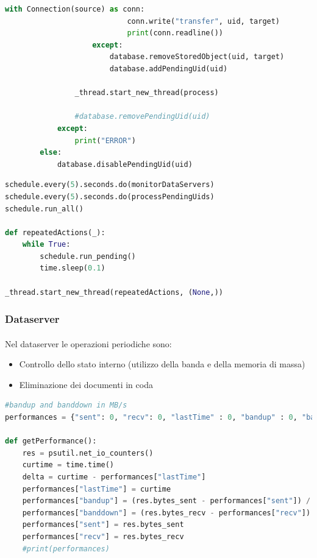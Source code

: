 \documentclass{article}
\begin{document}
\begin{lstlisting}[language=Python, title=Mantenimento del grado di replicazione dei documenti]
                        with Connection(source) as conn:
                            conn.write("transfer", uid, target)
                            print(conn.readline())
                    except:
                        database.removeStoredObject(uid, target)
                        database.addPendingUid(uid)

                _thread.start_new_thread(process)

                #database.removePendingUid(uid)
            except:
                print("ERROR")
        else:
            database.disablePendingUid(uid)
\end{lstlisting}

\begin{lstlisting}[language=Python, title=Scheduling ed esecuzione]
schedule.every(5).seconds.do(monitorDataServers)
schedule.every(5).seconds.do(processPendingUids)
schedule.run_all()

def repeatedActions(_):
    while True:
        schedule.run_pending()
        time.sleep(0.1)

_thread.start_new_thread(repeatedActions, (None,))
\end{lstlisting}


\subsubsection{Dataserver}

\paragraph{} Nel dataserver le operazioni periodiche sono:\begin{itemize}
	\item Controllo dello stato interno (utilizzo della banda e della memoria di massa)
	\item Eliminazione dei documenti in coda
\end{itemize}


\begin{lstlisting}[language=Python, title=Controllo dello stato interno]
#bandup and banddown in MB/s
performances = {"sent": 0, "recv": 0, "lastTime" : 0, "bandup" : 0, "banddown" : 0}

def getPerformance():
    res = psutil.net_io_counters()
    curtime = time.time()
    delta = curtime - performances["lastTime"]
    performances["lastTime"] = curtime
    performances["bandup"] = (res.bytes_sent - performances["sent"]) / delta / 1000000
    performances["banddown"] = (res.bytes_recv - performances["recv"]) / delta / 1000000
    performances["sent"] = res.bytes_sent
    performances["recv"] = res.bytes_recv
    #print(performances)
\end{lstlisting}
\end{document}
